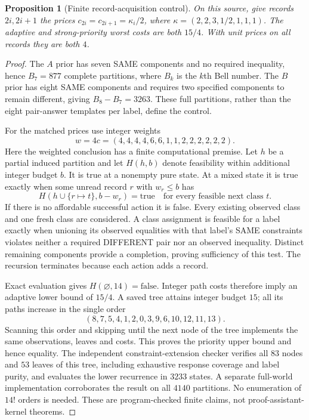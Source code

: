 \documentclass[pdflatex,sn-mathphys-num]{sn-jnl}
\theoremstyle{thmstyleone}
\newtheorem{proposition}[theorem]{Proposition}
\theoremstyle{thmstylethree}
\theoremstyle{thmstyletwo}
\begin{document}
\begin{proposition}[Finite record-acquisition control]\label{prop:record-control}
On this source, give records $2i,2i+1$ the prices $c_{2i}=c_{2i+1}=\kappa_i/2$, where $\kappa=(2,2,3,1/2,1,1,1)$. The adaptive and strong-priority worst costs are both $15/4$. With unit prices on all records they are both $4$.
\end{proposition}
\begin{proof}
The $A$ prior has seven SAME components and no required inequality, hence $B_7=877$ complete partitions, where $B_k$ is the $k$th Bell number. The $B$ prior has eight SAME components and requires two specified components to remain different, giving $B_8-B_7=3263$. These full partitions, rather than the eight pair-answer templates per label, define the control.

For the matched prices use integer weights
\[
 w=4c=(4,4,4,4,6,6,1,1,2,2,2,2,2,2).
\]
Here the weighted conclusion has a finite computational premise. Let $h$ be a partial induced partition and let $H(h,b)$ denote feasibility within additional integer budget $b$. It is true at a nonempty pure state. At a mixed state it is true exactly when some unread record $r$ with $w_r\leq b$ has
\[
 H(h\cup\{r\mapsto t\},b-w_r)=\mathrm{true}
 \quad\text{for every feasible next class }t.
\]
If there is no affordable successful action it is false. Every existing observed class and one fresh class are considered. A class assignment is feasible for a label exactly when unioning its observed equalities with that label's SAME constraints violates neither a required DIFFERENT pair nor an observed inequality. Distinct remaining components provide a completion, proving sufficiency of this test. The recursion terminates because each action adds a record.

Exact evaluation gives $H(\varnothing,14)=\mathrm{false}$. Integer path costs therefore imply an adaptive lower bound of $15/4$. A saved tree attains integer budget $15$; all its paths increase in the single order
\[
 (8,7,5,4,1,2,0,3,9,6,10,12,11,13).
\]
Scanning this order and skipping until the next node of the tree implements the same observations, leaves and costs. This proves the priority upper bound and hence equality. The independent constraint-extension checker verifies all $83$ nodes and $53$ leaves of this tree, including exhaustive response coverage and label purity, and evaluates the lower recurrence in $3233$ states. A separate full-world implementation corroborates the result on all $4140$ partitions. No enumeration of $14!$ orders is needed. These are program-checked finite claims, not proof-assistant-kernel theorems.


\end{proof}
\end{document}
